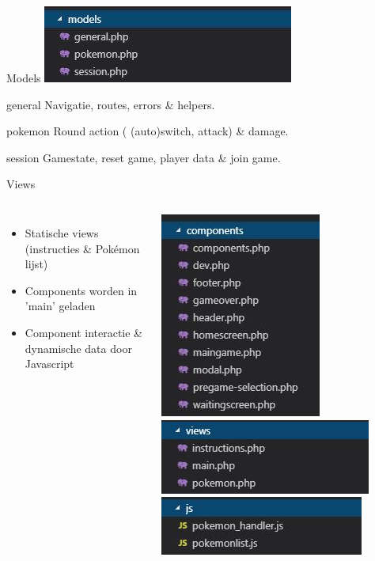 \documentclass{beamer}
\begin{document}
\begin{frame}{Models}
	\centering
	\includegraphics[scale=0.5]{Images/models.jpg}
	\begin{exampleblock}{general}
		Navigatie, routes, errors \& helpers.
	\end{exampleblock}
	\pause
	\begin{exampleblock}{pokemon}
		Round action ( (auto)switch, attack) \& damage.
	\end{exampleblock}
	\pause %
	\begin{exampleblock}{session}
		Gamestate, reset game, player data \& join game.
	\end{exampleblock}
\end{frame}


\begin{frame}{Views}
	\begin{columns}
			\begin{itemize}
				\item Statische views (instructies \& Pokémon lijst)
				\item Components worden in 'main' geladen
				\item Component interactie \& dynamische data door Javascript
			\end{itemize}
			\includegraphics[scale=0.5]{Images/components.jpg}
			\includegraphics[scale=0.5]{Images/views.jpg}
			\includegraphics[scale=0.5]{Images/js.jpg}
	\end{columns}
\end{frame}
\end{document}
